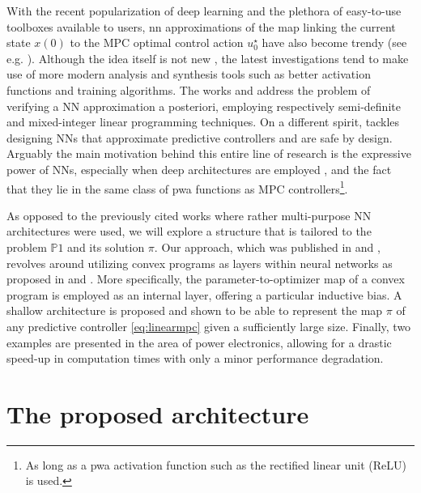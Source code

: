 With the recent popularization of deep learning and the plethora of easy-to-use toolboxes available to users, \ac{nn} approximations of the map linking the current state $x(0)$ to the MPC optimal control action $u_0^\star$ have also become trendy (see e.g. \cite{karg2020efficient,kumar2021industrial}). Although the idea itself is not new \citep{parisini1995receding}, the latest investigations tend to make use of more modern analysis and synthesis tools such as better activation functions and training algorithms. The works \cite{fazlyab2020safety} and \cite{schwan2022stability} address the problem of verifying a NN approximation a posteriori, employing respectively semi-definite and mixed-integer linear programming techniques. On a different spirit, \cite{paulson2020approximate} tackles designing NNs that approximate predictive controllers and are safe by design. Arguably the main motivation behind this entire line of research is the expressive power of NNs, especially when deep architectures are employed \citep{karg2020efficient}, and the fact that they lie in the same class of \ac{pwa} functions as MPC controllers\footnote{As long as a \ac{pwa} activation function such as the rectified linear unit (ReLU) is used.}.

As opposed to the previously cited works where rather multi-purpose NN architectures were used, we will explore a structure that is tailored to the problem $\mathds{P}1$ and its solution $\pi$. Our approach, which was published in \cite{maddalena2020neural} and \cite{maddalena2021embedded}, revolves around utilizing convex programs as layers within neural networks as proposed in \cite{amos2017optnet} and \cite{agrawal2019differentiable}. More specifically, the parameter-to-optimizer map of a convex program is employed as an internal layer, offering a particular inductive bias. A shallow architecture is proposed and shown to be able to represent the map $\pi$ of any predictive controller \eqref{eq:linearmpc} given a sufficiently large size. Finally, two examples are presented in the area of power electronics, allowing for a drastic speed-up in computation times with only a minor performance degradation.
	
\section{The proposed architecture}

